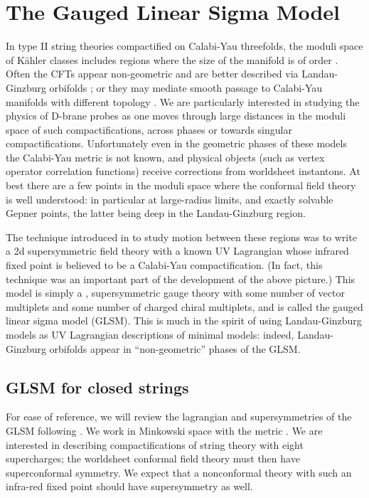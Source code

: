 \documentclass[a4paper,12pt]{article}
\begin{document}
\section{The Gauged Linear Sigma Model}

In type II string theories compactified on Calabi-Yau threefolds, the
moduli space of K\"ahler classes includes regions where the size of the
manifold is of order \coordHE{}.  Often the CFTs appear non-geometric and are
better described via Landau-Ginzburg orbifolds \cite{wittenphases,ag}; or
they may mediate smooth passage to Calabi-Yau manifolds with different
topology \cite{agm}. We are particularly interested in studying the
physics of D-brane probes as one moves through large distances in the
moduli space of such compactifications, across phases or towards singular
compactifications.  Unfortunately even in the geometric phases of these
models the Calabi-Yau metric is not known, and physical objects (such as
vertex operator correlation functions) receive corrections from worldsheet
instantons. At best there are a few points in the moduli space where the
conformal field theory is well understood: in particular at large-radius
limits, and exactly solvable Gepner points, the latter being deep in the
Landau-Ginzburg region. 

The technique introduced in \cite{wittenphases} to study motion between
these regions was to write a 2d supersymmetric field theory with a known
UV Lagrangian whose infrared fixed point is believed to be a Calabi-Yau
compactification. (In fact, this technique was an important part of the
development of the above picture.) This model is simply a \coordHE{}, \coordHE{}
supersymmetric gauge theory with some number of vector multiplets and some
number of charged chiral multiplets, and is called the gauged linear sigma
model (GLSM). This is much in the spirit of using Landau-Ginzburg models
as UV Lagrangian descriptions of minimal models: indeed, Landau-Ginzburg
orbifolds appear in ``non-geometric'' phases of the GLSM. 

\subsection{GLSM for closed strings}

For ease of reference, we will review the lagrangian and
supersymmetries of the GLSM following \cite{wittenphases}.  We work in
Minkowski space with the metric \myHighlight{$(-,+)$}\coordHE{}.  We are interested in describing
compactifications of string theory with eight supercharges; the worldsheet
conformal field theory must then have \coordHE{} superconformal symmetry. 
We expect that a nonconformal theory with such an infra-red fixed
point should have \coordHE{} supersymmetry as well. 
\end{document}
